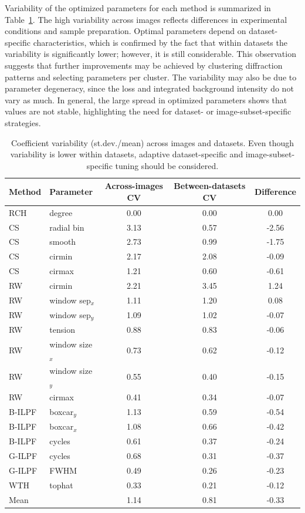 \documentclass[journal,article,submit,moreauthors]{Definitions/mdpi}
\begin{document}
Variability of the optimized parameters for each method is summarized in Table~\ref{tab:summary_total_variability}. The high variability across images reflects differences in experimental conditions and sample preparation. Optimal parameters depend on dataset-specific characteristics, which is confirmed by the fact that within datasets the variability is significantly lower; however, it is still considerable. This observation suggests that further improvements may be achieved by clustering diffraction patterns and selecting parameters per cluster. The variability may also be due to parameter degeneracy, since the loss and integrated background intensity do not vary as much. In general, the large spread in optimized parameters shows that values are not stable, highlighting the need for dataset- or image-subset-specific strategies.

\begin{table}[h]
\centering
\footnotesize
\caption{Coefficient variability (st.dev./mean) across images and datasets. Even though variability is lower within datasets, adaptive dataset-specific and image-subset-specific tuning should be considered.}
\label{tab:summary_total_variability}
\begin{tabular}{llccc}
\toprule
Method & Parameter & Across-images CV & Between-datasets CV & Difference \\
\midrule

RCH & degree & 0.00 & 0.00 & 0.00 \\
CS & radial bin & 3.13 & 0.57 & -2.56 \\
CS & smooth & 2.73 & 0.99 & -1.75 \\
CS & cirmin & 2.17 & 2.08 & -0.09 \\
CS & cirmax & 1.21 & 0.60 & -0.61 \\
RW & cirmin & 2.21 & 3.45 & 1.24 \\
RW & window sep$_x$ & 1.11 & 1.20 & 0.08 \\
RW & window sep$_y$ & 1.09 & 1.02 & -0.07 \\
RW & tension & 0.88 & 0.83 & -0.06 \\
RW & window size$_x$ & 0.73 & 0.62 & -0.12 \\
RW & window size$_y$ & 0.55 & 0.40 & -0.15 \\
RW & cirmax & 0.41 & 0.34 & -0.07 \\
B-ILPF & boxcar$_y$ & 1.13 & 0.59 & -0.54 \\
B-ILPF & boxcar$_x$ & 1.08 & 0.66 & -0.42 \\
B-ILPF & cycles & 0.61 & 0.37 & -0.24 \\
G-ILPF & cycles & 0.68 & 0.31 & -0.37 \\
G-ILPF & FWHM & 0.49 & 0.26 & -0.23 \\
WTH & tophat & 0.33 & 0.21 & -0.12 \\
\midrule
Mean &  & 1.14 & 0.81 & -0.33 \\

\bottomrule
\end{tabular}
\end{table}
\end{document}
